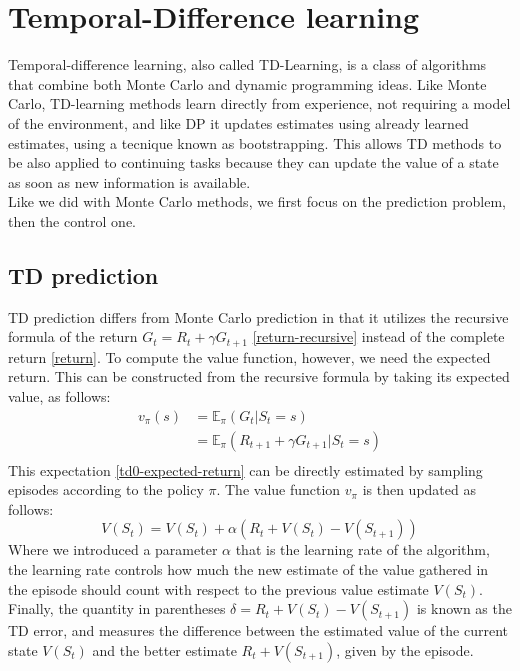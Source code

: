 \section{Temporal-Difference learning}
Temporal-difference learning, also called TD-Learning, is a class of algorithms that combine both Monte Carlo and dynamic programming ideas. Like Monte Carlo, TD-learning methods learn directly from experience, not requiring a model of the environment, and like DP it updates estimates using already learned estimates, using a tecnique known as bootstrapping. This allows TD methods to be also applied to continuing tasks because they can update the value of a state as soon as new information is available.\\
Like we did with Monte Carlo methods, we first focus on the prediction problem, then the control one.

\subsection{TD prediction}
TD prediction differs from Monte Carlo prediction in that it utilizes the recursive formula of the return $G_t = R_t + \gamma G_{t+1}$ \ref{return-recursive} instead of the complete return \ref{return}. To compute the value function, however, we need the expected return. This can be constructed from the recursive formula by taking its expected value, as follows:
\begin{equation}
    \begin{split}
        v_{\pi}(s) & = \mathds{E}_{\pi}(G_t | S_t = s) \\
        & = \mathds{E}_{\pi}(R_{t+1} + \gamma G_{t+1} | S_t = s)\\
    \end{split}
    \label{td0-expected-return}
\end{equation}
This expectation \ref{td0-expected-return} can be directly estimated by sampling episodes according to the policy $\pi$. The value function $v_{\pi}$ is then updated as follows:
\begin{equation}
    V(S_t) = V(S_t) + \alpha (R_t + V(S_t) - V(S_{t+1}))
    \label{td0-update}
\end{equation}
Where we introduced a parameter $\alpha$ that is the learning rate of the algorithm, the learning rate controls how much the new estimate of the value gathered in the episode should count with respect to the previous value estimate $V(S_t)$.\\
Finally, the quantity in parentheses $\delta = R_t + V(S_t) - V(S_{t+1})$ is known as the TD error, and measures the difference between the estimated value of the current state $V(S_t)$ and the better estimate $R_t + V(S_{t+1})$, given by the episode.\\

